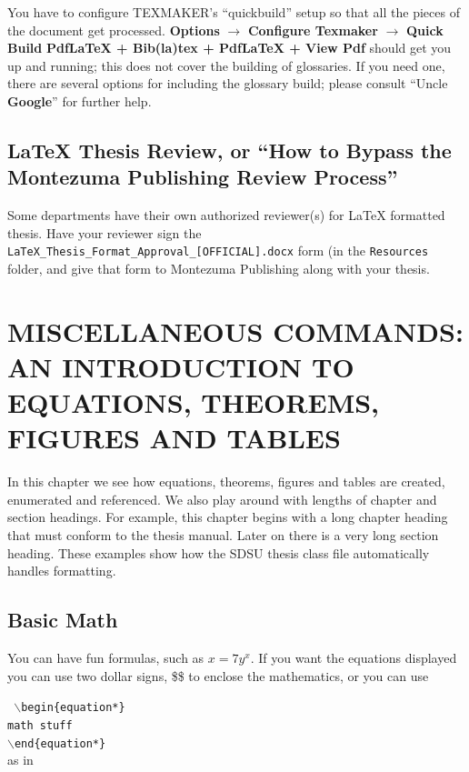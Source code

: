 You have to configure TEXMAKER's ``quickbuild'' setup so that all the
pieces of the document get processed.  \textbf{Options} $\rightarrow$
\textbf{Configure Texmaker} $\rightarrow$ \textbf{Quick Build}
\textbf{PdfLaTeX + Bib(la)tex + PdfLaTeX + View Pdf} should get you up
and running; this does not cover the building of glossaries.  If you
need one, there are several options for including the glossary build;
please consult ``Uncle \textbf{Google}'' for further help.


\section{\LaTeX{} Thesis Review, or ``How to Bypass the Montezuma
  Publishing Review Process''}
\label{sec:LaTeXReview}

Some departments have their own authorized reviewer(s) for \LaTeX{}
formatted thesis.  Have your reviewer sign the
\texttt{LaTeX\_Thesis\_Format\_Approval\_[OFFICIAL].docx}
form (in the \texttt{Resources} folder, and give that form to
Montezuma Publishing along with your thesis.



\chapter{MISCELLANEOUS COMMANDS: AN INTRODUCTION TO EQUATIONS,
  THEOREMS, FIGURES AND TABLES}

In this chapter we see how equations, theorems, figures and tables are
created, enumerated and referenced.  We also play around with lengths
of chapter and section headings.  For example, this chapter begins
with a long chapter heading that must conform to the thesis manual.
Later on there is a very long section heading.  These examples show
how the SDSU thesis class file automatically handles formatting.



\section{Basic Math}

You can have fun formulas, such as $x= 7 y^x$.  If you want the
equations displayed you can use two dollar signs, \$\$ to enclose the
mathematics, or you can use

\medskip\noindent
\texttt{%
  \hspace*{2em}$\backslash$begin\{equation*\} \\
  \hspace*{3em}math stuff \\
  \hspace*{2em}$\backslash$end\{equation*\}
}\\%
as in

